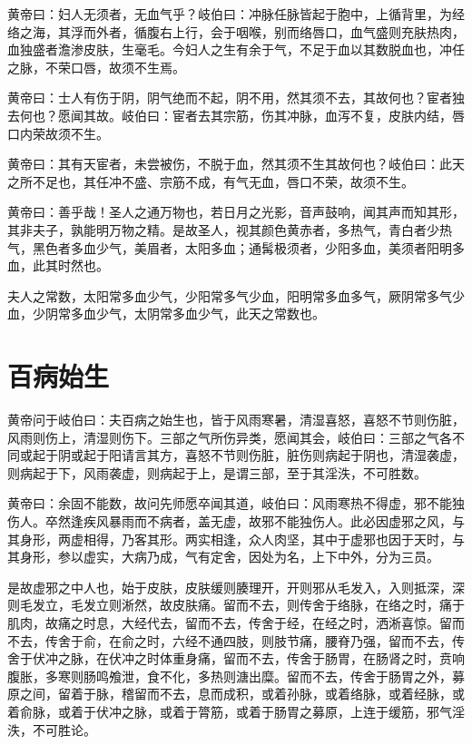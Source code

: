 \documentclass[12pt,UTF8]{ctexbook}
\begin{document}
	黄帝曰：妇人无须者，无血气乎？岐伯曰：冲脉任脉皆起于胞中，上循背里，为经络之海，其浮而外者，循腹右上行，会于咽喉，别而络唇口，血气盛则充肤热肉，血独盛者澹渗皮肤，生毫毛。今妇人之生有余于气，不足于血以其数脱血也，冲任之脉，不荣口唇，故须不生焉。
	
	黄帝曰：士人有伤于阴，阴气绝而不起，阴不用，然其须不去，其故何也？宦者独去何也？愿闻其故。岐伯曰：宦者去其宗筋，伤其冲脉，血泻不复，皮肤内结，唇口内荣故须不生。
	
	黄帝曰：其有天宦者，未尝被伤，不脱于血，然其须不生其故何也？岐伯曰：此天之所不足也，其任冲不盛、宗筋不成，有气无血，唇口不荣，故须不生。
	
	黄帝曰：善乎哉！圣人之通万物也，若日月之光影，音声鼓响，闻其声而知其形，其非夫子，孰能明万物之精。是故圣人，视其颜色黄赤者，多热气，青白者少热气，黑色者多血少气，美眉者，太阳多血；通髯极须者，少阳多血，美须者阳明多血，此其时然也。
	
	夫人之常数，太阳常多血少气，少阳常多气少血，阳明常多血多气，厥阴常多气少血，少阴常多血少气，太阴常多血少气，此天之常数也。
	
	\chapter{百病始生}
	
	黄帝问于岐伯曰：夫百病之始生也，皆于风雨寒暑，清湿喜怒，喜怒不节则伤脏，风雨则伤上，清湿则伤下。三部之气所伤异类，愿闻其会，岐伯曰：三部之气各不同或起于阴或起于阳请言其方，喜怒不节则伤脏，脏伤则病起于阴也，清湿袭虚，则病起于下，风雨袭虚，则病起于上，是谓三部，至于其淫泆，不可胜数。
	
	黄帝曰：余固不能数，故问先师愿卒闻其道，岐伯曰：风雨寒热不得虚，邪不能独伤人。卒然逢疾风暴雨而不病者，盖无虚，故邪不能独伤人。此必因虚邪之风，与其身形，两虚相得，乃客其形。两实相逢，众人肉坚，其中于虚邪也因于天时，与其身形，参以虚实，大病乃成，气有定舍，因处为名，上下中外，分为三员。
	
	是故虚邪之中人也，始于皮肤，皮肤缓则腠理开，开则邪从毛发入，入则抵深，深则毛发立，毛发立则淅然，故皮肤痛。留而不去，则传舍于络脉，在络之时，痛于肌肉，故痛之时息，大经代去，留而不去，传舍于经，在经之时，洒淅喜惊。留而不去，传舍于俞，在俞之时，六经不通四肢，则肢节痛，腰脊乃强，留而不去，传舍于伏冲之脉，在伏冲之时体重身痛，留而不去，传舍于肠胃，在肠肾之时，贲响腹胀，多寒则肠鸣飧泄，食不化，多热则溏出糜。留而不去，传舍于肠胃之外，募原之间，留着于脉，稽留而不去，息而成积，或着孙脉，或着络脉，或着经脉，或着俞脉，或着于伏冲之脉，或着于膂筋，或着于肠胃之募原，上连于缓筋，邪气淫泆，不可胜论。
	
\end{document}
